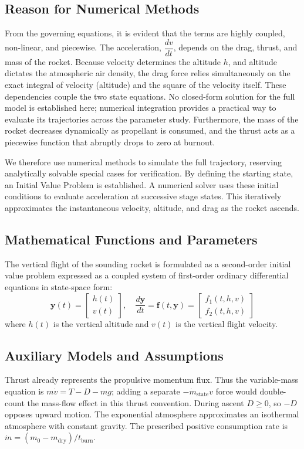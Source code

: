 \documentclass{article}
\begin{document}
\subsection{Reason for Numerical Methods}
From the governing equations, it is evident that the terms are highly coupled, non-linear, and piecewise. The acceleration, $\dfrac{dv}{dt}$, depends on the drag, thrust, and mass of the rocket. Because velocity determines the altitude $h$, and altitude dictates the atmospheric air density, the drag force relies simultaneously on the exact integral of velocity (altitude) and the square of the velocity itself. These dependencies couple the two state equations. No closed-form solution for the full model is established here; numerical integration provides a practical way to evaluate its trajectories across the parameter study. Furthermore, the mass of the rocket decreases dynamically as propellant is consumed, and the thrust acts as a piecewise function that abruptly drops to zero at burnout.

We therefore use numerical methods to simulate the full trajectory, reserving analytically solvable special cases for verification. By defining the starting state, an Initial Value Problem is established. A numerical solver uses these initial conditions to evaluate acceleration at successive stage states. This iteratively approximates the instantaneous velocity, altitude, and drag as the rocket ascends.

\subsection{Mathematical Functions and Parameters}
The vertical flight of the sounding rocket is formulated as a second-order initial value problem expressed as a coupled system of first-order ordinary differential equations in state-space form:
\begin{equation}
    \mathbf{y}(t) = \begin{bmatrix} h(t) \\ v(t) \end{bmatrix}, \quad \frac{d\mathbf{y}}{dt} = \mathbf{f}(t, \mathbf{y})= \begin{bmatrix} f_1(t, h, v) \\ f_2(t, h, v) \end{bmatrix}
\end{equation}
where $h(t)$ is the vertical altitude and $v(t)$ is the vertical flight velocity.
\subsection{Auxiliary Models and Assumptions}
Thrust already represents the propulsive momentum flux. Thus the variable-mass equation is $m\dot v=T-D-mg$; adding a separate $-\dot m_{\mathrm{state}}v$ force would double-count the mass-flow effect in this thrust convention. During ascent $D\geq0$, so $-D$ opposes upward motion. The exponential atmosphere approximates an isothermal atmosphere with constant gravity. The prescribed positive consumption rate is $\dot m=(m_0-m_{\mathrm{dry}})/t_{\mathrm{burn}}$.
\end{document}
